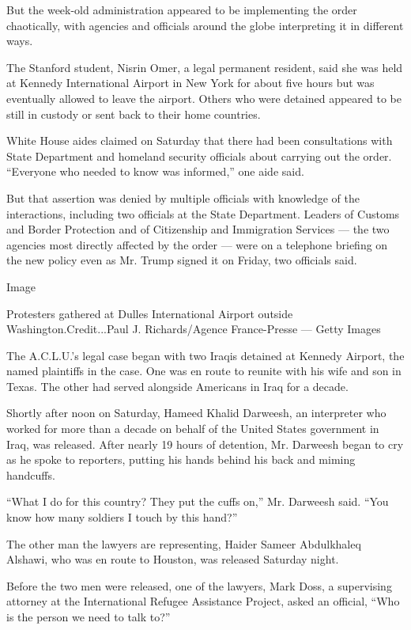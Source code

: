 But the week-old administration appeared to be implementing the order
chaotically, with agencies and officials around the globe interpreting
it in different ways.

The Stanford student, Nisrin Omer, a legal permanent resident, said she
was held at Kennedy International Airport in New York for about five
hours but was eventually allowed to leave the airport. Others who were
detained appeared to be still in custody or sent back to their home
countries.

White House aides claimed on Saturday that there had been consultations
with State Department and homeland security officials about carrying out
the order. ``Everyone who needed to know was informed,'' one aide said.

But that assertion was denied by multiple officials with knowledge of
the interactions, including two officials at the State Department.
Leaders of Customs and Border Protection and of Citizenship and
Immigration Services --- the two agencies most directly affected by the
order --- were on a telephone briefing on the new policy even as Mr.
Trump signed it on Friday, two officials said.

Image

Protesters gathered at Dulles International Airport outside
Washington.Credit...Paul J. Richards/Agence France-Presse --- Getty
Images

The A.C.L.U.'s legal case began with two Iraqis detained at Kennedy
Airport, the named plaintiffs in the case. One was en route to reunite
with his wife and son in Texas. The other had served alongside Americans
in Iraq for a decade.

Shortly after noon on Saturday, Hameed Khalid Darweesh, an interpreter
who worked for more than a decade on behalf of the United States
government in Iraq, was released. After nearly 19 hours of detention,
Mr. Darweesh began to cry as he spoke to reporters, putting his hands
behind his back and miming handcuffs.

``What I do for this country? They put the cuffs on,'' Mr. Darweesh
said. ``You know how many soldiers I touch by this hand?''

The other man the lawyers are representing, Haider Sameer Abdulkhaleq
Alshawi, who was en route to Houston, was released Saturday night.

Before the two men were released, one of the lawyers, Mark Doss, a
supervising attorney at the International Refugee Assistance Project,
asked an official, ``Who is the person we need to talk to?''

